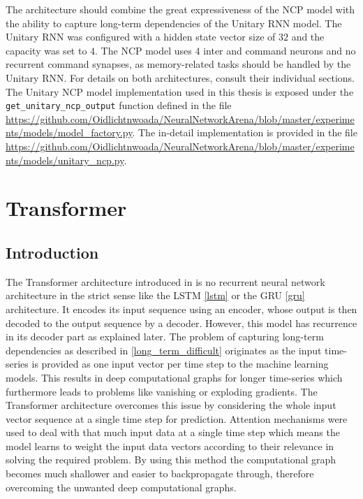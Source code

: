 \documentclass[draft,final]{vutinfth} %
\begin{document}
    The architecture should combine the great expressiveness of the NCP model with the ability to capture long-term dependencies of the Unitary RNN model.
    The Unitary RNN was configured with a hidden state vector size of $32$ and the capacity was set to $4$. 
    The NCP model uses $4$ inter and command neurons and no recurrent command synapses, as memory-related tasks should be handled by the Unitary RNN.
    For details on both architectures, consult their individual sections.
    The Unitary NCP model implementation used in this thesis is exposed under the \texttt{get\_unitary\_ncp\_output} function defined in the file \url{https://github.com/Oidlichtnwoada/NeuralNetworkArena/blob/master/experiments/models/model_factory.py}.
    The in-detail implementation is provided in the file \url{https://github.com/Oidlichtnwoada/NeuralNetworkArena/blob/master/experiments/models/unitary_ncp.py}.

    \section{Transformer} \label{transformer}
    \subsection{Introduction}
    The Transformer architecture introduced in \cite{Transformer} is no recurrent neural network architecture in the strict sense like the LSTM \ref{lstm} or the GRU \ref{gru} architecture.
    It encodes its input sequence using an encoder, whose output is then decoded to the output sequence by a decoder.
    However, this model has recurrence in its decoder part as explained later.
    The problem of capturing long-term dependencies as described in \ref{long_term_difficult} originates as the input time-series is provided as one input vector per time step to the machine learning models.
    This results in deep computational graphs for longer time-series which furthermore leads to problems like vanishing or exploding gradients.
    The Transformer architecture overcomes this issue by considering the whole input vector sequence at a single time step for prediction. 
    Attention mechanisms were used to deal with that much input data at a single time step which means the model learns to weight the input data vectors according to their relevance in solving the required problem.
    By using this method the computational graph becomes much shallower and easier to backpropagate through, therefore overcoming the unwanted deep computational graphs.
\end{document}

